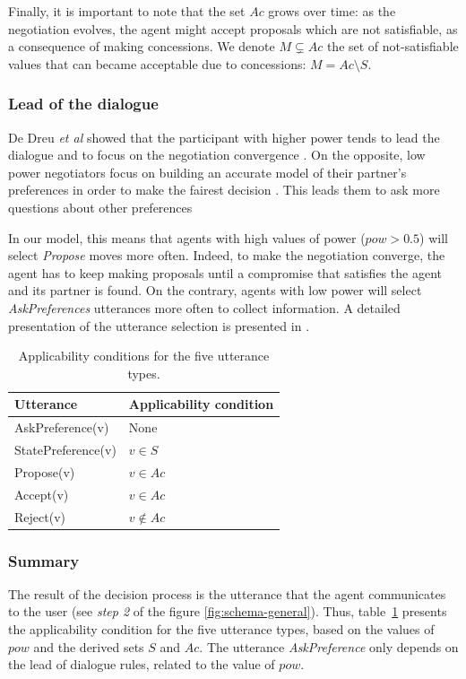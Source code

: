 \documentclass[conference, letterpaper]{IEEEtran}
\begin{document}
	Finally, it is important to note that the set $Ac$ grows over time: as the negotiation evolves, the agent might accept proposals which are not satisfiable, as a consequence of making concessions. We denote $M\subsetneq Ac$ the set of not-satisfiable values that can became acceptable due to concessions: $M = Ac\setminus S$.

	
	
	\subsubsection{Lead of the dialogue}
	De Dreu \textit{et al} showed that the participant with higher power tends to lead the dialogue and to focus on the negotiation convergence \cite{magee2007power,de2004influence}. On the opposite, low power negotiators focus on building an accurate model of their partner's preferences in order to make the fairest decision \cite{de1995impact}. This leads them to ask more questions about other preferences
	
	In our model, this means that agents with high values of power ($pow>0.5$) will select \emph{Propose} moves more often. Indeed, to make the negotiation converge, the agent has to keep making proposals until a compromise that satisfies the agent and its partner is found.
	On the contrary, agents with low power will select \emph{AskPreferences} utterances more often to collect information. A detailed presentation of the utterance selection is presented in \cite{ouali2017computational}.
	
		\begin{table}[ht]
			\centering
			\caption{Applicability conditions for the five utterance types.}
			\label{tab:utt}
			\begin{tabular}  {|l|l|}
				\hline
				Utterance & Applicability condition \\
				\hline
				AskPreference(v) & None \\
				\hline 
				StatePreference(v) & $v\in S$ \\
				\hline 
				Propose(v) & $v\in Ac$ \\
				\hline
				Accept(v)  & $v\in Ac$ \\
				\hline
				Reject(v) & $v\notin Ac$ \\
				\hline
			\end{tabular}
		\end{table}
		
	
	\subsubsection{Summary}	
	The result of the decision process is the utterance that the agent communicates to the user (see \textit{step 2} of the figure \ref{fig:schema-general}). Thus, table~\ref{tab:utt} presents the applicability condition for the five utterance types, based on the values of $pow$ and the derived sets $S$ and $Ac$. The utterance \emph{AskPreference} only depends on the lead of dialogue rules, related to the value of $pow$.
\end{document}
